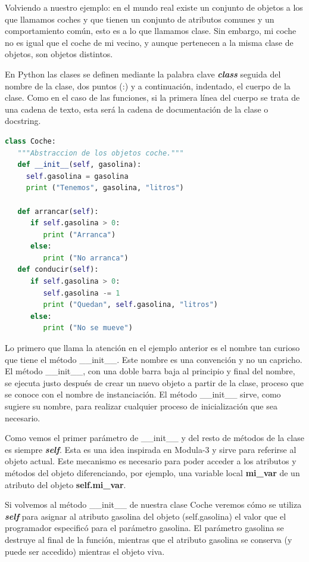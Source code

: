 \documentclass[12pt, twoside]{report}
\begin{document}
Volviendo a nuestro ejemplo: en el mundo real existe un conjunto de objetos a los que llamamos coches y que tienen un conjunto de atributos comunes y un comportamiento común, esto es a lo que llamamos clase. Sin embargo, mi coche no es igual que el coche de mi vecino, y aunque pertenecen a la misma clase de objetos, son objetos distintos.

En Python las clases se definen mediante la palabra clave \textit{\textbf{class}} seguida del nombre de la clase, dos puntos (:) y a continuación, indentado, el cuerpo de la clase. Como en el caso de las funciones, si la primera línea del cuerpo se trata de una cadena de texto, esta será la cadena de documentación de la clase o docstring.

\begin{lstlisting}[language=Python]
class Coche:
   """Abstraccion de los objetos coche."""
   def __init__(self, gasolina):
     self.gasolina = gasolina
     print ("Tenemos", gasolina, "litros")
		
   def arrancar(self):
      if self.gasolina > 0:
         print ("Arranca")
      else:
         print ("No arranca")
   def conducir(self):
      if self.gasolina > 0:
         self.gasolina -= 1
         print ("Quedan", self.gasolina, "litros")
      else:
         print ("No se mueve")
\end{lstlisting}


Lo primero que llama la atención en el ejemplo anterior es el nombre tan curioso que tiene el método \_\_init\_\_. Este nombre es una convención y no un capricho. El método \_\_init\_\_, con una doble barra baja al principio y final del nombre, se ejecuta justo después de crear un nuevo objeto a partir de la clase, proceso que se conoce con el nombre de instanciación. El método \_\_init\_\_ sirve, como sugiere su nombre, para realizar cualquier proceso de inicialización que sea necesario.

Como vemos el primer parámetro de  \_\_init\_\_ y del resto de métodos de la clase es siempre \textit{\textbf{self}}. Esta es una idea inspirada en Modula-3 y sirve para referirse al objeto actual. Este mecanismo es necesario para poder acceder a los atributos y métodos del objeto diferenciando, por ejemplo, una variable local \textbf{mi\_var} de un atributo del objeto \textbf{self.mi\_var}.

Si volvemos al método \_\_init\_\_ de nuestra clase Coche veremos cómo se utiliza \textbf{\textit{self}} para asignar al atributo gasolina del objeto (self.gasolina) el valor que el programador especificó para el parámetro gasolina. El parámetro gasolina se destruye al final de la función, mientras que el atributo gasolina se conserva (y puede ser accedido) mientras el objeto viva.
\end{document}
